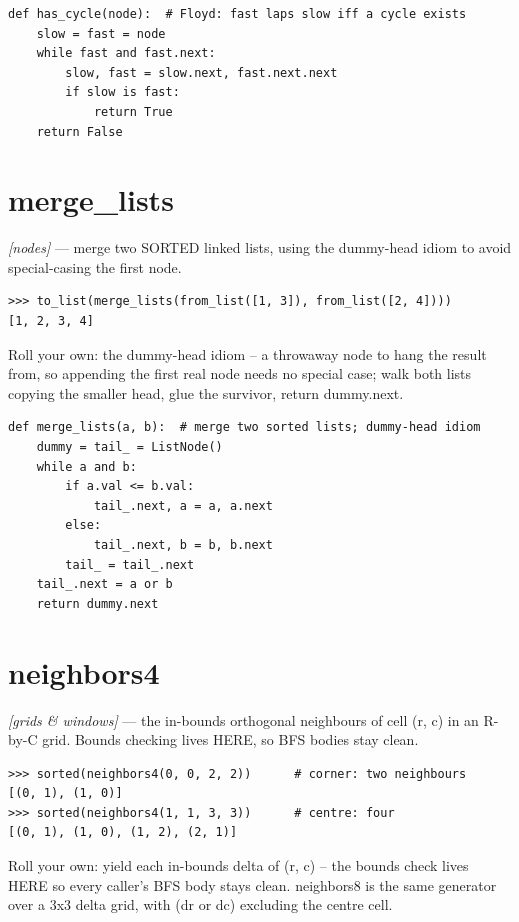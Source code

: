 \documentclass[11pt,letterpaper]{book}
\begin{document}
\begin{lstlisting}[style=code]
def has_cycle(node):  # Floyd: fast laps slow iff a cycle exists
    slow = fast = node
    while fast and fast.next:
        slow, fast = slow.next, fast.next.next
        if slow is fast:
            return True
    return False
\end{lstlisting}

\section{merge\_lists}
\noindent\textit{[nodes]} --- merge two SORTED linked lists, using the dummy-head idiom to avoid special-casing the first node.
\begin{lstlisting}[style=spec]
>>> to_list(merge_lists(from_list([1, 3]), from_list([2, 4])))
[1, 2, 3, 4]
\end{lstlisting}

Roll your own: the dummy-head idiom -- a throwaway node to hang the result from, so appending the first real node needs no special case; walk both lists copying the smaller head, glue the survivor, return dummy.next.

\begin{lstlisting}[style=code]
def merge_lists(a, b):  # merge two sorted lists; dummy-head idiom
    dummy = tail_ = ListNode()
    while a and b:
        if a.val <= b.val:
            tail_.next, a = a, a.next
        else:
            tail_.next, b = b, b.next
        tail_ = tail_.next
    tail_.next = a or b
    return dummy.next
\end{lstlisting}

\section{neighbors4}
\noindent\textit{[grids \& windows]} --- the in-bounds orthogonal neighbours of cell (r, c) in an R-by-C grid. Bounds checking lives HERE, so BFS bodies stay clean.
\begin{lstlisting}[style=spec]
>>> sorted(neighbors4(0, 0, 2, 2))      # corner: two neighbours
[(0, 1), (1, 0)]
>>> sorted(neighbors4(1, 1, 3, 3))      # centre: four
[(0, 1), (1, 0), (1, 2), (2, 1)]
\end{lstlisting}

Roll your own: yield each in-bounds delta of (r, c) -- the bounds check lives HERE so every caller's BFS body stays clean. neighbors8 is the same generator over a 3x3 delta grid, with (dr or dc) excluding the centre cell.
\end{document}
